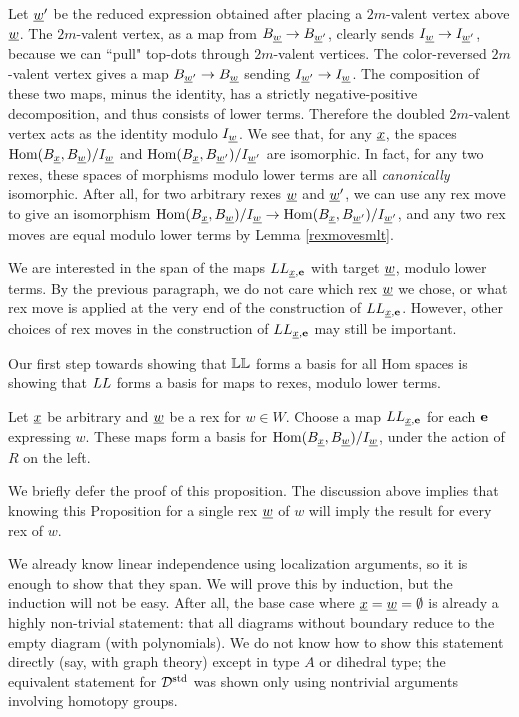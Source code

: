 Let ${\underline{w}}'$ be the reduced expression obtained after placing a $2m$-valent vertex above ${\underline{w}}$. The $2m$-valent vertex, as a map from $B_{\underline{w}} \rightarrow B_{{\underline{w}}'}$, clearly sends $I_{\underline{w}} \rightarrow
I_{{\underline{w}}'}$, because we can ``pull" top-dots through $2m$-valent vertices. The color-reversed $2m$-valent vertex gives a map $B_{{\underline{w}}'} \rightarrow B_{\underline{w}}$ sending $I_{{\underline{w}}'} \rightarrow I_{\underline{w}}$. The
composition of these two maps, minus the identity, has a strictly negative-positive decomposition, and thus consists of lower terms. Therefore the doubled $2m$-valent vertex acts as the
identity modulo $I_{\underline{w}}$. We see that, for any ${\underline{x}}$, the spaces $\operatorname{Hom}(B_{\underline{x}},B_{\underline{w}})/I_{\underline{w}}$ and $\operatorname{Hom}(B_{\underline{x}},B_{{\underline{w}}'})/I_{{\underline{w}}'}$ are isomorphic. In fact, for any two rexes, these spaces of
morphisms modulo lower terms are all \emph{canonically} isomorphic. After all, for two arbitrary rexes ${\underline{w}}$ and ${\underline{w}}'$, we can use any rex move to give an isomorphism 
$\operatorname{Hom}(B_{\underline{x}},B_{\underline{w}})/I_{\underline{w}} \rightarrow \operatorname{Hom}(B_{\underline{x}},B_{{\underline{w}}'})/I_{{\underline{w}}'}$, and any two rex moves are equal modulo lower terms by Lemma \ref{rexmovesmlt}.

We are interested in the span of the maps $LL_{{\underline{x}},{\mathbf e}}$ with target ${\underline{w}}$, modulo lower terms. By the previous paragraph, we do not care which rex ${\underline{w}}$ we chose, or what
rex move is applied at the very end of the construction of $LL_{{\underline{x}},{\mathbf e}}$. However, other choices of rex moves in the construction of $LL_{{\underline{x}},{\mathbf e}}$ may still be important.

Our first step towards showing that $\mathbb{LL}$ forms a basis for all Hom spaces is showing that $LL$ forms a basis for maps to rexes, modulo lower terms.

\begin{prop} \label{LLabasismlt} Let ${\underline{x}}$ be arbitrary and ${\underline{w}}$ be a rex for $w \in W$. Choose a map $LL_{{\underline{x}},{\mathbf e}}$ for each ${\mathbf e}$ expressing $w$. These maps form a basis for
$\operatorname{Hom}(B_{\underline{x}},B_{\underline{w}})/I_{\underline{w}}$, under the action of $R$ on the left. \end{prop}

We briefly defer the proof of this proposition. The discussion above implies that knowing this Proposition for a single rex ${\underline{w}}$ of $w$ will imply the result for every
rex of $w$.

We already know linear independence using localization arguments, so it is enough to show that they span. We will prove this by induction, but the induction will not be easy. After all,
the base case where ${\underline{x}}={\underline{w}}=\emptyset$ is already a highly non-trivial statement: that all diagrams without boundary reduce to the empty diagram (with polynomials). We do not know how to
show this statement directly (say, with graph theory) except in type $A$ or dihedral type; the equivalent statement for ${\mathcal{D}}^{\textrm{std}}$ was shown only using nontrivial arguments involving homotopy groups.

